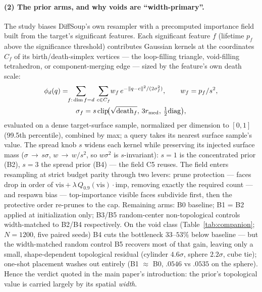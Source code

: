 \paragraph{(2) The prior arms, and why voids are ``width-primary''.} The
study biases DiffSoup's own resampler with a precomputed importance field
built from the target's significant features. Each significant feature $f$
(lifetime $p_f$ above the significance threshold) contributes Gaussian
kernels at the coordinates $C_f$ of its birth/death-simplex vertices ---
the loop-filling triangle, void-filling tetrahedron, or component-merging
edge --- sized by the feature's own death scale:
\begin{equation}
\begin{gathered}
\phi_d(q)=\!\!\sum_{f:\,\dim f=d}\,\sum_{c\in C_f}\! w_f\,
  e^{-\lVert q-c\rVert^2/(2\sigma_f^2)},\qquad w_f = p_f/s^2,\\
\sigma_f = s\,\mathrm{clip}\!\big(\sqrt{\smash[b]{\mathrm{death}_f}},\,
  3r_{\mathrm{med}},\,\tfrac{1}{2}\mathrm{diag}\big),
\end{gathered}
\end{equation}
evaluated on a dense target-surface sample, normalized per dimension to
$[0,1]$ (99.5th percentile), combined by max; a query takes its nearest
surface sample's value. The spread knob $s$ widens each kernel while
preserving its injected surface mass ($\sigma\,{\to}\,s\sigma$,
$w\,{\to}\,w/s^2$, so $w\sigma^2$ is $s$-invariant): $s{=}1$ is the
concentrated prior (B2), $s{=}3$ the spread prior (B4) --- the field C5
reuses. The field enters resampling at strict budget parity through two
levers: prune protection --- faces drop in order of $\mathrm{vis} +
\lambda\,Q_{0.9}(\mathrm{vis})\cdot\mathrm{imp}$, removing exactly the
required count --- and respawn bias --- top-importance visible faces
subdivide first, then the protective order re-prunes to the cap. Remaining
arms: B0 baseline; B1 = B2 applied at initialization only; B3/B5
random-center non-topological controls width-matched to B2/B4 respectively.
On the void class
(Table~\ref{tab:companion}; $N{=}1200$, five paired seeds) B4 cuts the
bottleneck $33$--$53\%$ below baseline --- but the width-matched random
control B5 recovers most of that gain, leaving only a small, shape-dependent
topological residual (cylinder $4.6\sigma$, sphere $2.2\sigma$, cube tie);
one-shot placement washes out entirely (B1 $\approx$ B0, $.0546$ vs $.0535$
on the sphere). Hence the verdict quoted in the main paper's introduction:
the prior's topological value is carried largely by its spatial
\emph{width}.

